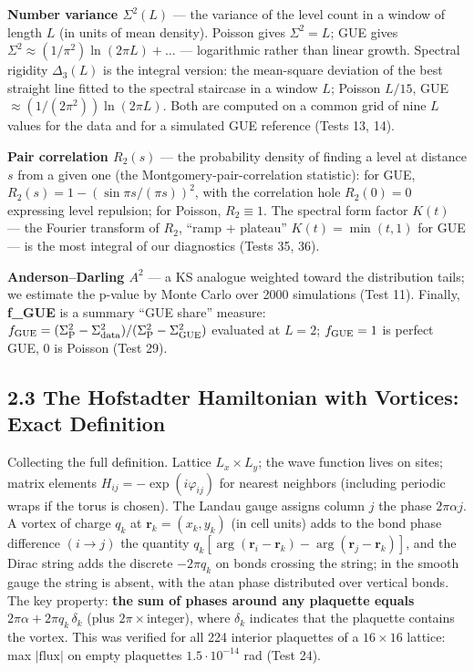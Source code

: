 \documentclass[
]{article}
\begin{document}
\textbf{Number variance \(\Sigma^2(L)\)} --- the variance of the level
count in a window of length \(L\) (in units of mean density). Poisson
gives \(\Sigma^2 = L\); GUE gives
\(\Sigma^2 \approx (1/\pi^2)\ln(2\pi L) + \ldots\) --- logarithmic
rather than linear growth. Spectral rigidity \(\Delta_3(L)\) is the
integral version: the mean-square deviation of the best straight line
fitted to the spectral staircase in a window \(L\); Poisson \(L/15\),
GUE \(\approx (1/(2\pi^2))\ln(2\pi L)\). Both are computed on a common grid of
nine \(L\) values for the data and for a simulated GUE reference (Tests
13, 14).

\textbf{Pair correlation \(R_2(s)\)} --- the probability density of
finding a level at distance \(s\) from a given one (the
Montgomery-pair-correlation statistic): for GUE,
\(R_2(s) = 1 - (\sin \pi s/(\pi s))^2\), with the correlation hole
\(R_2(0)=0\) expressing level repulsion; for Poisson, \(R_2 \equiv 1\).
The spectral form factor \(K(t)\) --- the Fourier transform of \(R_2\),
``ramp + plateau'' \(K(t)=\min(t,1)\) for GUE --- is the most integral
of our diagnostics (Tests 35, 36).

\textbf{Anderson--Darling \(A^2\)} --- a KS analogue weighted toward the
distribution tails; we estimate the p-value by Monte Carlo over 2000
simulations (Test 11). Finally, \textbf{f\_GUE} is a summary ``GUE
share'' measure:
\(f_{\rm GUE} = (\Sigma^2_{\rm P} - \Sigma^2_{\rm data})/(\Sigma^2_{\rm P} - \Sigma^2_{\rm GUE})\)
evaluated at \(L=2\); \(f_{\rm GUE}=1\) is perfect GUE, \(0\) is Poisson
(Test 29).

\subsection{2.3 The Hofstadter Hamiltonian with Vortices: Exact
Definition}\label{the-hofstadter-hamiltonian-with-vortices-exact-definition}

Collecting the full definition. Lattice \(L_x\times L_y\); the wave
function lives on sites; matrix elements
\(H_{ij} = -\exp(i\varphi_{ij})\) for nearest neighbors (including
periodic wraps if the torus is chosen). The Landau gauge assigns column
\(j\) the phase \(2\pi\alpha j\). A vortex of charge \(q_k\) at
\(\mathbf r_k=(x_k,y_k)\) (in cell units) adds to the bond phase
difference \((i\to j)\) the quantity
\(q_k[\arg(\mathbf r_i-\mathbf r_k)-\arg(\mathbf r_j-\mathbf r_k)]\),
and the Dirac string adds the discrete \(-2\pi q_k\) on bonds crossing
the string; in the smooth gauge the string is absent, with the atan
phase distributed over vertical bonds. The key property: \textbf{the sum
of phases around any plaquette equals
\(2\pi\alpha + 2\pi q_k\,\delta_k\)} (plus \(2\pi\times\)integer), where
\(\delta_k\) indicates that the plaquette contains the vortex. This was
verified for all 224 interior plaquettes of a \(16\times16\) lattice:
max \(|\mathrm{flux}|\) on empty plaquettes \(1.5\cdot10^{-14}\) rad
(Test 24).
\end{document}
